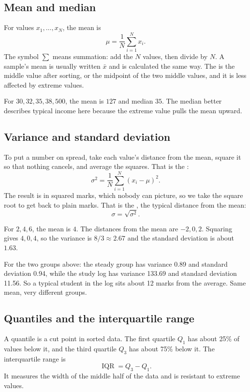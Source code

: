 \subsection{Mean and median}

For values $x_1,\ldots,x_N$, the mean is
\[
  \mu=\frac{1}{N}\sum_{i=1}^{N}x_i.
\]
The symbol $\sum$ means summation: add the $N$ values, then divide by $N$. A sample's mean is usually written $\bar{x}$ and is calculated the same way. The  is the middle value after sorting, or the midpoint of the two middle values, and it is less affected by extreme values.

\begin{workedexample}
For $30,32,35,38,500$, the mean is $127$ and median $35$. The median better describes typical income here because the extreme value pulls the mean upward.
\end{workedexample}

\subsection{Variance and standard deviation}

To put a number on spread, take each value's distance from the mean, square it so that nothing cancels, and average the squares. That is the :
\[
  \sigma^2=\frac{1}{N}\sum_{i=1}^{N}(x_i-\mu)^2.
\]
The result is in squared marks, which nobody can picture, so we take the square root to get back to plain marks. That is the , the typical distance from the mean:
\[
  \sigma=\sqrt{\sigma^2}.
\]

\begin{workedexample}
For $2,4,6$, the mean is $4$. The distances from the mean are $-2,0,2$. Squaring gives $4,0,4$, so the variance is $8/3\approx2.67$ and the standard deviation is about $1.63$.

For the two groups above: the steady group has variance 0.89 and standard deviation 0.94, while the study log has variance 133.69 and standard deviation 11.56. So a typical student in the log sits about 12 marks from the average. Same mean, very different groups.
\end{workedexample}

\subsection{Quantiles and the interquartile range}

A quantile is a cut point in sorted data. The first quartile $Q_1$ has about 25\% of values below it, and the third quartile $Q_3$ has about 75\% below it. The interquartile range is
\[
  \operatorname{IQR}=Q_3-Q_1.
\]
It measures the width of the middle half of the data and is resistant to extreme values.

